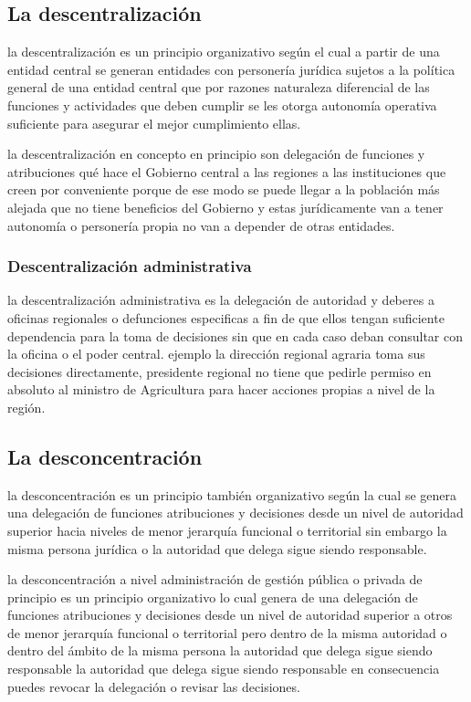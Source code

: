 \documentclass[
  jou,
  floatsintext,
  longtable,
  a4paper,
  nolmodern,
  notxfonts,
  notimes,
  12pt,
  colorlinks=true,linkcolor=blue,citecolor=blue,urlcolor=blue]{apa7}
\begin{document}
\subsection{La descentralización}\label{la-descentralizaciuxf3n-1}

la descentralización es un principio organizativo según el cual a partir
de una entidad central se generan entidades con personería jurídica
sujetos a la política general de una entidad central que por razones
naturaleza diferencial de las funciones y actividades que deben cumplir
se les otorga autonomía operativa suficiente para asegurar el mejor
cumplimiento ellas.

la descentralización en concepto en principio son delegación de
funciones y atribuciones qué hace el Gobierno central a las regiones a
las instituciones que creen por conveniente porque de ese modo se puede
llegar a la población más alejada que no tiene beneficios del Gobierno y
estas jurídicamente van a tener autonomía o personería propia no van a
depender de otras entidades.

\subsubsection{Descentralización
administrativa}\label{descentralizaciuxf3n-administrativa}

la descentralización administrativa es la delegación de autoridad y
deberes a oficinas regionales o defunciones especificas a fin de que
ellos tengan suficiente dependencia para la toma de decisiones sin que
en cada caso deban consultar con la oficina o el poder central. ejemplo
la dirección regional agraria toma sus decisiones directamente,
presidente regional no tiene que pedirle permiso en absoluto al ministro
de Agricultura para hacer acciones propias a nivel de la región.

\subsection{La desconcentración}\label{la-desconcentraciuxf3n}

la desconcentración es un principio también organizativo según la cual
se genera una delegación de funciones atribuciones y decisiones desde un
nivel de autoridad superior hacia niveles de menor jerarquía funcional o
territorial sin embargo la misma persona jurídica o la autoridad que
delega sigue siendo responsable.

la desconcentración a nivel administración de gestión pública o privada
de principio es un principio organizativo lo cual genera de una
delegación de funciones atribuciones y decisiones desde un nivel de
autoridad superior a otros de menor jerarquía funcional o territorial
pero dentro de la misma autoridad o dentro del ámbito de la misma
persona la autoridad que delega sigue siendo responsable la autoridad
que delega sigue siendo responsable en consecuencia puedes revocar la
delegación o revisar las decisiones.
\end{document}
